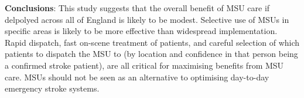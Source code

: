 \textbf{Conclusions}: This study suggests that the overall benefit of MSU care if delpolyed across all of England is likely to be modest. Selective use of MSUs in specific areas is likely to be more effective than widespread implementation. Rapid dispatch, fast on-scene treatment of patients, and careful selection of which patients to dispatch the MSU to (by location and confidence in that person being a confirmed stroke patient), are all critical for maximising benefits from MSU care. MSUs should not be seen as an alternative to optimising day-to-day emergency stroke systems.
